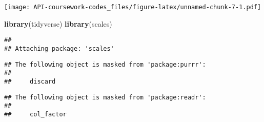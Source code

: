 \documentclass[
]{article}
\newenvironment{Shaded}{\begin{snugshade}}{\end{snugshade}}
\newcommand{\FunctionTok}[1]{\textcolor[rgb]{0.13,0.29,0.53}{\textbf{#1}}}
\newcommand{\NormalTok}[1]{#1}
\begin{document}
\texttt{[image: API-coursework-codes\_files/figure-latex/unnamed-chunk-7-1.pdf]}

\begin{Shaded}
\begin{Highlighting}[]
\FunctionTok{library}\NormalTok{(tidyverse)}
\FunctionTok{library}\NormalTok{(scales)}
\end{Highlighting}
\end{Shaded}

\begin{verbatim}
## 
## Attaching package: 'scales'
\end{verbatim}

\begin{verbatim}
## The following object is masked from 'package:purrr':
## 
##     discard
\end{verbatim}

\begin{verbatim}
## The following object is masked from 'package:readr':
## 
##     col_factor
\end{verbatim}
\end{document}
